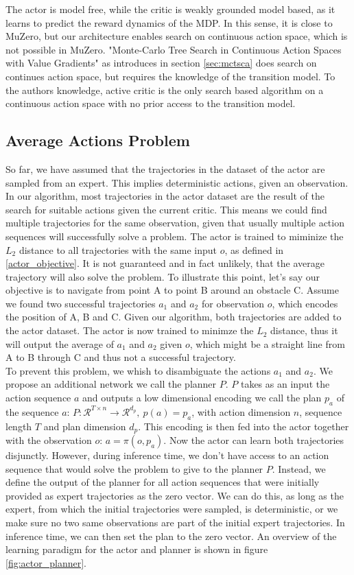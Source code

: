 The actor is model free, while the critic is weakly grounded model based, as it learns to predict the reward dynamics of the MDP. In this sense, it is close to MuZero, 
but our architecture enables search on continuous action space, which is not possible in MuZero. 
"Monte-Carlo Tree Search in Continuous Action Spaces with Value Gradients" as introduces in section \ref{sec:mctsca} does search on continues action space, 
but requires the knowledge of the transition model. 
To the authors knowledge, active critic is the only search based algorithm on a continuous action space with no prior access to the transition model.

\subsection{Average Actions Problem}
\label{avr_action_problem}
So far, we have assumed that the trajectories in the dataset of the actor are sampled from an expert. This implies deterministic actions, given an observation. 
In our algorithm, most trajectories in the actor dataset are the result of the search for suitable actions given the current critic. This means we could find
multiple trajectories for the same observation, given that usually multiple action sequences will successfully solve a problem. The actor is trained to miminize 
the $L_2$ distance to all trajectories with the same input $o$, as defined in \ref{actor_objective}. It is not guaranteed and in fact unlikely, that the 
average trajectory will also solve the problem. To illustrate this point, let's say our objective 
is to navigate from point A to point B around an obstacle C. Assume we found two successful trajectories 
$a_1$ and $a_2$ for observation $o$, which encodes the position of A, B and C. Given our algorithm, both trajectories are added to the actor dataset. 
The actor is now trained to minimze the $L_2$ distance, thus it will output the average of $a_1$ and $a_2$ given $o$, which might be a straight line from A to B 
through C and thus not a successful trajectory. \\
To prevent this problem, we whish to disambiguate the actions $a_1$ and $a_2$. We propose an additional network we call the planner $P$. $P$ takes as an input 
the action sequence $a$ and outputs a low dimensional encoding we call the plan $p_a$ of the sequence $a$: 
$P:\mathcal{R}^{T\times n} \rightarrow \mathcal{R}^{d_p},\ p(a) = p_a$, with action dimension $n$, sequence length $T$ and plan dimension $d_p$. This encoding is then fed into the actor together 
with the observation $o$: $a = \pi(o, p_a)$. Now the actor can learn both trajectories disjunctly. However, during inference time, we don't have access to an action sequence 
that would solve the problem to give to the planner $P$. Instead, we define the output of the planner for all action sequences that were initially provided as 
expert trajectories as the zero vector. We can do this, as long as the expert, from which the initial trajectories were sampled, is deterministic, or we make sure 
no two same observations are part of the initial expert trajectories. In inference time, we can then set the plan to the zero vector. An overview of the learning 
paradigm for the actor and planner is shown in figure \ref{fig:actor_planner}.


